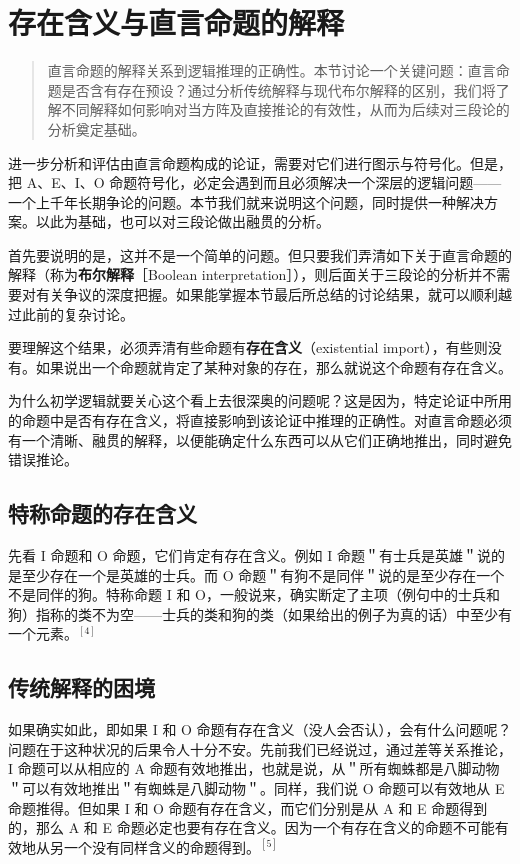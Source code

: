 \section{存在含义与直言命题的解释}

\begin{quotation}
直言命题的解释关系到逻辑推理的正确性。本节讨论一个关键问题：直言命题是否含有存在预设？通过分析传统解释与现代布尔解释的区别，我们将了解不同解释如何影响对当方阵及直接推论的有效性，从而为后续对三段论的分析奠定基础。
\end{quotation}

进一步分析和评估由直言命题构成的论证，需要对它们进行图示与符号化。但是，把 A、E、I、O 命题符号化，必定会遇到而且必须解决一个深层的逻辑问题——一个上千年长期争论的问题。本节我们就来说明这个问题，同时提供一种解决方案。以此为基础，也可以对三段论做出融贯的分析。

首先要说明的是，这并不是一个简单的问题。但只要我们弄清如下关于直言命题的解释（称为\textbf{布尔解释}［Boolean interpretation］），则后面关于三段论的分析并不需要对有关争议的深度把握。如果能掌握本节最后所总结的讨论结果，就可以顺利越过此前的复杂讨论。

要理解这个结果，必须弄清有些命题有\textbf{存在含义}（existential import），有些则没有。如果说出一个命题就肯定了某种对象的存在，那么就说这个命题有存在含义。

为什么初学逻辑就要关心这个看上去很深奥的问题呢？这是因为，特定论证中所用的命题中是否有存在含义，将直接影响到该论证中推理的正确性。对直言命题必须有一个清晰、融贯的解释，以便能确定什么东西可以从它们正确地推出，同时避免错误推论。

\subsection{特称命题的存在含义}

先看 I 命题和 O 命题，它们肯定有存在含义。例如 I 命题＂有士兵是英雄＂说的是至少存在一个是英雄的士兵。而 O 命题＂有狗不是同伴＂说的是至少存在一个不是同伴的狗。特称命题 I 和 O，一般说来，确实断定了主项（例句中的士兵和狗）指称的类不为空——士兵的类和狗的类（如果给出的例子为真的话）中至少有一个元素。$^{[4]}$

\subsection{传统解释的困境}

如果确实如此，即如果 I 和 O 命题有存在含义（没人会否认），会有什么问题呢？问题在于这种状况的后果令人十分不安。先前我们已经说过，通过差等关系推论，I 命题可以从相应的 A 命题有效地推出，也就是说，从＂所有蜘蛛都是八脚动物＂可以有效地推出＂有蜘蛛是八脚动物＂。同样，我们说 O 命题可以有效地从 E 命题推得。但如果 I 和 O 命题有存在含义，而它们分别是从 A 和 E 命题得到的，那么 A 和 E 命题必定也要有存在含义。因为一个有存在含义的命题不可能有效地从另一个没有同样含义的命题得到。$^{[5]}$

